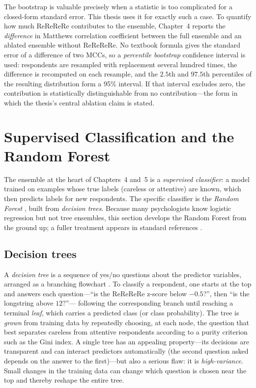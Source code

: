 \documentclass[doc,11pt,donotrepeattitle]{apa7}
\begin{document}
The bootstrap is valuable precisely when a statistic is too complicated for a
closed-form standard error. This thesis uses it for exactly such a case. To
quantify how much ReReReRe contributes to the ensemble, Chapter~4 reports the
\emph{difference} in Matthews correlation coefficient between the full ensemble
and an ablated ensemble without ReReReRe. No textbook formula gives the standard
error of a difference of two MCCs, so a \emph{percentile bootstrap} confidence
interval is used: respondents are resampled with replacement several hundred
times, the difference is recomputed on each resample, and the $2.5$th and
$97.5$th percentiles of the resulting distribution form a 95\% interval. If that
interval excludes zero, the contribution is statistically distinguishable from
no contribution---the form in which the thesis's central ablation claim is
stated.

\section{Supervised Classification and the Random Forest}
\label{sec:rf}

The ensemble at the heart of Chapters~4 and~5 is a \emph{supervised classifier}:
a model trained on examples whose true labels (careless or attentive) are known,
which then predicts labels for new respondents. The specific classifier is the
\emph{Random Forest} \parencite{breiman2001random}, built from \emph{decision
trees}. Because many psychologists know logistic regression but not tree
ensembles, this section develops the Random Forest from the ground up; a fuller
treatment appears in standard references \parencite{hastie2009elements,
james2013introduction}.

\subsection{Decision trees}

A \emph{decision tree} is a sequence of yes/no questions about the predictor
variables, arranged as a branching flowchart \parencite{breiman1984cart}. To
classify a respondent, one starts at the top and answers each question---``is
the ReReReRe z-score below $-0.5$?'', then ``is the longstring above $12$?''---
following the corresponding branch until reaching a terminal \emph{leaf}, which
carries a predicted class (or class probability). The tree is \emph{grown} from
training data by repeatedly choosing, at each node, the question that best
separates careless from attentive respondents according to a purity criterion
such as the Gini index. A single tree has an appealing property---its decisions
are transparent and can interact predictors automatically (the second question
asked depends on the answer to the first)---but also a serious flaw: it is
\emph{high-variance}. Small changes in the training data can change which
question is chosen near the top and thereby reshape the entire tree.
\end{document}
